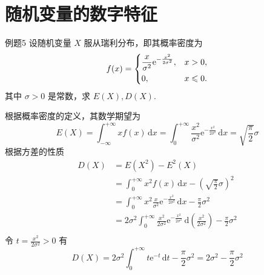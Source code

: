 \section{随机变量的数字特征}

\begin{question}{例题5}
    设随机变量 $X$ 服从瑞利分布，即其概率密度为
    $$
        f(x) = \begin{dcases}
            \frac{x}{\sigma^2} \mathrm{e}^{-\frac{x^2}{2\sigma^2}}, & x>0,           \\
            0,                                                      & x \leqslant 0.
        \end{dcases}
    $$
    其中 $\sigma>0$ 是常数，求 $E(X), D(X)$.
\end{question}
\begin{solution}
    根据概率密度的定义，其数学期望为
    $$
        E(X) = \int_{-\infty}^{+\infty} xf(x) \,\mathrm{d}x
        = \int_{0}^{+\infty} \frac{x^2}{\sigma^2} \mathrm{e}^{-\frac{x^2}{2\sigma^2}} \,\mathrm{d}x
        = \sqrt{\frac{\pi}{2}}\sigma
    $$
    根据方差的性质
    $$
        \begin{aligned}
            D(X)
             & = E\left(X^2\right) - E^2(X)                                                                                       \\
             & = \int_0^{+\infty} x^2 f(x) \,\mathrm{d}x - \left(\sqrt{\frac{\pi}{2}}\sigma\right)^2                              \\
             & = \int_0^{+\infty} x^2\frac{x}{\sigma^2} \mathrm{e}^{-\frac{x^2}{2\sigma^2}} \,\mathrm{d}x - \frac{\pi}{2}\sigma^2 \\
             & = 2\sigma^2\int_0^{+\infty}\frac{x^2}{2\sigma^2}
            \mathrm{e}^{-\frac{x^2}{2\sigma^2}} \,\mathrm{d}\left(\frac{x^2}{2\sigma^2}\right) - \frac{\pi}{2}\sigma^2            \\
        \end{aligned}
    $$
    令 $t=\frac{x^2}{2\sigma^2} > 0$ 有
    $$
        D(X) = 2\sigma^2\int_0^{+\infty}t \mathrm{e}^{-t} \,\mathrm{d}t - \frac{\pi}{2}\sigma^2 = 2\sigma^2 - \frac{\pi}{2}\sigma^2
    $$
\end{solution}


